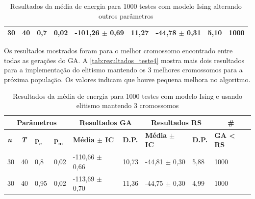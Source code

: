 \begin{table}[h!]
\begin{tabular}{|l|l|l|l|l|l|l|l|l|}
		30                          & 40                          & 0,7        & 0,02       & -101,26 $\pm$ 0,69                           & 11,27                          & -44,78 $\pm$ 0,31                            & 5,10                           & 1000                                      \\ \hline
	\end{tabular}
	\caption{Resultados da média de energia para 1000 testes com modelo Ising alterando outros parâmetros}
	\label{tab:resultados_teste3}
\end{table}

Os resultados mostrados foram para o melhor cromossomo encontrado entre todas as gerações do GA. A \autoref{tab:resultados_teste4} mostra mais dois resultados para a implementação do elitismo mantendo os 3 melhores cromossomos para a próxima população. Os valores indicam que houve pequena melhora no algoritmo.

\begin{table}[h!]
	\centering
	\begin{tabular}{|l|l|l|l|l|l|l|l|l|}
		\hline
		\multicolumn{4}{|c|}{\textbf{Parâmetros}}                                                    & \multicolumn{2}{c|}{\textbf{Resultados GA}}                                        & \multicolumn{2}{c|}{\textbf{Resultados RS}}                                        & \multicolumn{1}{c|}{\textbf{\#}}                      \\ \hline
		\textbf{\textit{n}} & \textbf{\textit{T}} & $\bm{p_c}$ & $\bm{p_m}$ & \textbf{Média $\pm$ IC} & \textbf{D.P.} & \textbf{Média $\pm$ IC} & \textbf{D.P.} & \textbf{GA < RS} \\ \hline
		30                          & 40                          & 0,8        & 0,02       & -110,66 $\pm$ 0,66                           & 10,73                          & -44,81 $\pm$ 0,30                            & 5,88                           & 1000                                      \\ \hline
		30                          & 40                          & 0,95        & 0,02       & -113,69 $\pm$ 0,70                            & 11,36                          & -44,75 $\pm$ 0,30                            & 4,99                           & 1000                                      \\ \hline
	\end{tabular}
	\caption{Resultados da média de energia para 1000 testes com modelo Ising e usando elitismo mantendo 3 cromossomos}
	\label{tab:resultados_teste4}
\end{table}

